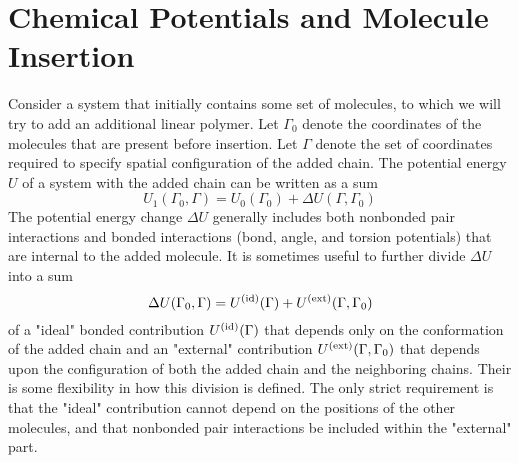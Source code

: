 \documentclass[12pt]{article} %
\newcommand\system{\Gamma_{0}}
\newcommand\chain{\Gamma}
\newcommand\Utot{U_{1}}
\newcommand\Usys{U_{0}}
\newcommand\delU{\Delta U}
\newcommand\Uid{U^{({\rm id})}}
\newcommand\Uext{U^{({\rm ext})}}
\begin{document}



\section{Chemical Potentials and Molecule Insertion}
Consider a system that initially contains some set of molecules, to which we will try to add an additional linear polymer.  Let $\system$ denote the coordinates of the molecules that are present before insertion. Let $\chain$ denote the set of coordinates required to specify spatial configuration of the added chain. The potential energy $U$ of a system with the added chain can be written as a sum 
\begin{equation}
    \Utot(\system, \chain) = \Usys(\system) + \delU (\chain, \system)
\end{equation}
The potential energy change $\Delta U$ generally includes both nonbonded pair interactions and 
bonded interactions (bond, angle, and torsion potentials) that are internal to the added 
molecule. It is sometimes useful to further divide $\delU$ into a sum
\begin{equation}
   \delU(\system, \chain) = \Uid(\chain) + \Uext (\chain, \system)
\end{equation}
of a "ideal" bonded contribution $\Uid(\chain)$ that depends only on the conformation
of the added chain and an "external" contribution $\Uext(\chain,\system)$ that depends upon the
configuration of both the added chain and the neighboring chains. Their is some flexibility in 
how this division is defined. The only strict requirement is that the "ideal" contribution 
cannot depend on the positions of the other molecules, and that nonbonded pair interactions be 
included within the "external" part.
\end{document}
